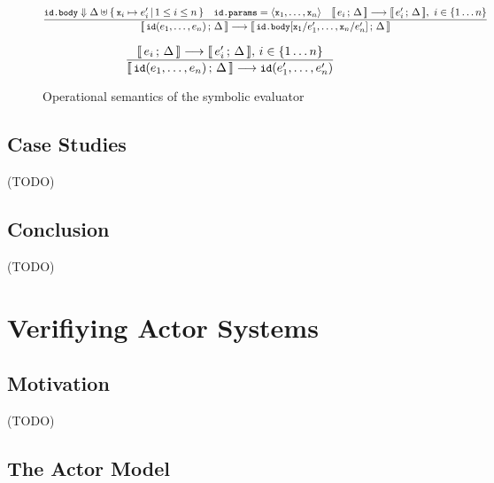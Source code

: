 \documentclass[a4paper,twoside]{article}
\newcommand{\lb}[2]{\llbracket\, #1\,;\, #2\, \rrbracket}
\newcommand{\TODO}[1]{\textcolor{YellowOrange}{(TODO)}} %
\newcommand{\stt}[1]{\texttt{\small{#1}}}
\begin{document}
\begin{figure}[htb]
\begin{framed}
\begin{equation}
\dfrac{
 \stt{id.body} \Downarrow \Delta \uplus \{\,\stt{x}_i \mapsto e_i'\,|\, 1 \leq i \leq n\,\}
 \quad
 \stt{id.params} = \langle \stt{x}_1, \ldots, \stt{x}_n \rangle
 \quad
 \lb{e_i}{\Delta} \longrightarrow \lb{e_i'}{\Delta},\  i \in \{1 \ldots n\}
}{
  \lb{\stt{id}(e_1,\ldots,e_n)}{\Delta} \longrightarrow
  \lb{\stt{id.body}[\stt{x}_1/e_1',\ldots,\stt{x}_n/e_n']}{\Delta}
}
\label{fig:symbolicsem:fi2}
\end{equation}

\begin{equation}
\dfrac{
 \lb{e_i}{\Delta} \longrightarrow \lb{e_i'}{\Delta},\, i \in \{1 \ldots n\}
}{
  \lb{\stt{id}(e_1,\ldots,e_n)}{\Delta} \longrightarrow
  \stt{id}(e_1',\ldots,e_n')
}
\label{fig:symbolicsem:fi3}
\end{equation}

\end{framed}
\vspace{-10pt}
\caption{Operational semantics of the symbolic evaluator \label{fig:symbolicsem}}
\end{figure}

\subsection{Case Studies}

\TODO{Case Studies}

\subsection{Conclusion}

\TODO{Conclusion}


\clearpage
\section{Verifiying Actor Systems}
\label{actors}

\subsection{Motivation}

\TODO{Motivation}

\subsection{The Actor Model}
\end{document}
